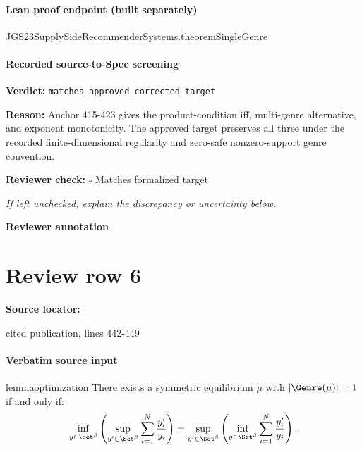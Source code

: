 \documentclass[10pt]{article}
\newcommand{\reviewerbox}{%
  \par\noindent\fbox{\parbox{0.96\linewidth}{\rule{0pt}{0.38in}}}\par
}
\newcommand{\reviewmatch}[1]{%
  \par\noindent\textbf{Reviewer check:} $\square$\; #1\par
  \noindent\emph{If left unchecked, explain the discrepancy or uncertainty below.}\par
}
\begin{document}
\paragraph{Lean proof endpoint (built separately)}\begin{ReviewVerbatim}
JGS23SupplySideRecommenderSystems.theoremSingleGenre
\end{ReviewVerbatim}

\paragraph{Recorded source-to-Spec screening}
\textbf{Verdict:} \texttt{matches\_approved\_corrected\_target}
\\
{\raggedright
\textbf{Reason:} Anchor 415-\allowbreak{}423 gives the product-\allowbreak{}condition iff, multi-\allowbreak{}genre alternative, and exponent monotonicity.\allowbreak{}  The approved target preserves all three under the recorded finite-\allowbreak{}dimensional regularity and zero-\allowbreak{}safe nonzero-\allowbreak{}support genre convention.\allowbreak{}
\par}
\reviewmatch{Matches formalized target}
\noindent\textbf{Reviewer annotation}\par
\reviewerbox
\clearpage
\hypertarget{source-claim-80d9b15ea99d744d}{}
\section*{Review row 6}
\textbf{Source locator:} {\footnotesize\raggedright cited publication, lines 442-\allowbreak{}449\par}
\paragraph{Verbatim source input}
\begin{ReviewVerbatim}
\begin{restatable}[Informal]{lemma}{optimization}
\label{lemma:optimizationprogram}
There exists a symmetric equilibrium $\mu$ with $|\Genre(\mu)| = 1$ if and only if:
\begin{equation}
    \label{eq:optimizationprogrammain}
    \inf_{y \in \Set^{\beta}} \left(\sup_{y' \in \Set^{\beta}}   \sum_{i=1}^N  \frac{y'_i}{y_i} \right) = \sup_{y' \in \Set^{\beta}} \left(\inf_{y \in \Set^{\beta}} \sum_{i=1}^N  \frac{y'_i}{y_i}\right).
\end{equation}
\end{restatable}
\end{ReviewVerbatim}
\end{document}
